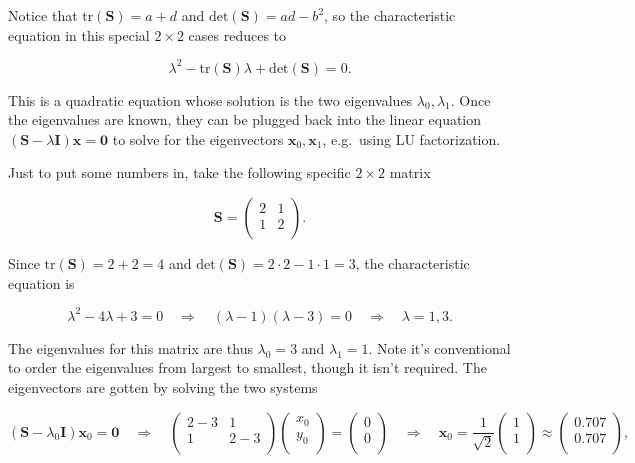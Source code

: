 \documentclass[
  letterpaper,
  DIV=11,
  numbers=noendperiod]{scrreprt}
\begin{document}
Notice that \(\text{tr}(\mathbf{S}) = a + d\) and
\(\text{det}(\mathbf{S}) = ad-b^2\), so the characteristic equation in
this special \(2 \times 2\) cases reduces to

\[\lambda^2 - \text{tr}(\mathbf{S})\lambda + \text{det}(\mathbf{S}) = 0.\]

This is a quadratic equation whose solution is the two eigenvalues
\(\lambda_0, \lambda_1\). Once the eigenvalues are known, they can be
plugged back into the linear equation
\((\mathbf{S} - \lambda \mathbf{I})\mathbf{x} = \mathbf{0}\) to solve
for the eigenvectors \(\mathbf{x}_0, \mathbf{x}_1\), e.g.~using LU
factorization.

Just to put some numbers in, take the following specific \(2 \times 2\)
matrix

\[
\mathbf{S} = 
\begin{pmatrix}
2 & 1 \\
1 & 2 \\
\end{pmatrix}.
\]

Since \(\text{tr}(\mathbf{S})=2+2=4\) and
\(\text{det}(\mathbf{S})=2 \cdot 2 - 1 \cdot 1 = 3\), the characteristic
equation is

\[\lambda^2 - 4\lambda + 3 = 0 \quad \Longrightarrow \quad (\lambda-1)(\lambda - 3) = 0 \quad \Longrightarrow \quad \lambda=1, 3.\]

The eigenvalues for this matrix are thus \(\lambda_0 = 3\) and
\(\lambda_1 = 1\). Note it's conventional to order the eigenvalues from
largest to smallest, though it isn't required. The eigenvectors are
gotten by solving the two systems

\[
(\mathbf{S} - \lambda_0 \mathbf{I})\mathbf{x}_0 = \mathbf{0} \quad \Longrightarrow \quad
\begin{pmatrix}
2-3 & 1 \\
1 & 2-3 \\
\end{pmatrix}
\begin{pmatrix}
x_0 \\
y_0 \\
\end{pmatrix} = 
\begin{pmatrix}
0 \\
0 \\
\end{pmatrix} \quad \Longrightarrow \quad
\mathbf{x}_0 = 
\frac{1}{\sqrt{2}}
\begin{pmatrix}
1 \\
1 \\
\end{pmatrix} \approx
\begin{pmatrix}
0.707 \\
0.707 \\
\end{pmatrix},
\]
\end{document}
